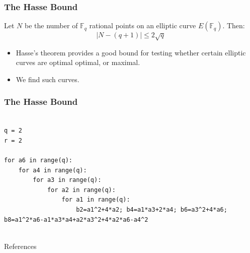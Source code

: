 \documentclass{beamer}
\newcommand{\F}{\mathbb{F}}
\theoremstyle{plain} %
\theoremstyle{definition}
\theoremstyle{remark}
\begin{document}
\begin{frame}
\frametitle{The Hasse Bound}
    
\begin{theorem}
    Let $N$ be the number of $\F_q$ rational points on an elliptic curve $E(\F_q)$. Then:
    \begin{equation}
        |N-(q+1)| \leq 2\sqrt{q}
    \end{equation}
\end{theorem}

\begin{itemize}
    \item Hasse's theorem provides a good bound for testing whether certain elliptic curves are optimal optimal, or maximal.
    
    \item We find such curves.
\end{itemize}

\end{frame}

\begin{frame}
\frametitle{The Hasse Bound}
    
\begin{verbatim}

q = 2
r = 2 

for a6 in range(q):
    for a4 in range(q):
        for a3 in range(q):
            for a2 in range(q):
                for a1 in range(q):
                    b2=a1^2+4*a2; b4=a1*a3+2*a4; b6=a3^2+4*a6; b8=a1^2*a6-a1*a3*a4+a2*a3^2+4*a2*a6-a4^2
   
\end{verbatim}

\end{frame}






\begin{frame}{References}


 
\end{frame}



\end{document}
